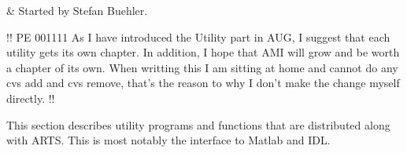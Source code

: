 %
%
 \label{sec:utilities}

%
%
 & Started by Stefan Buehler.\\
\stophistory


!! PE 001111 As I have introduced the Utility part in AUG, I suggest that each
utility gets its own chapter. In addition, I hope that AMI will grow and be worth a chapter of its own. When writting this I am sitting at home and cannot do
any cvs add and cvs remove, that's the reason to why I don't make the change myself directly. !!

This section describes utility programs and functions that are
distributed along with ARTS. This is most notably the interface to
Matlab and IDL.


\label{sec:utilities:aii}







